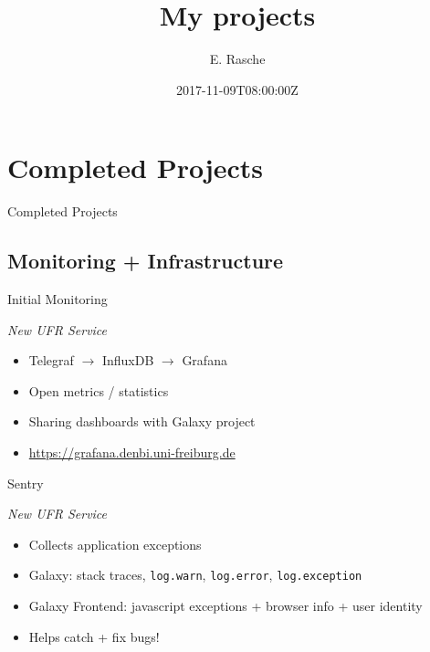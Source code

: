 \documentclass[12pt]{ufrslides}
\title[Projects]{My projects}
\author{E. Rasche}
\date{2017-11-09T08:00:00Z}
\begin{document}
\frame{\titlepage}

\section[Completed]{Completed Projects}
\begin{frame}{Completed Projects}
\end{frame}

\subsection[Monit/Infra]{Monitoring + Infrastructure}
	\begin{frame}{Initial Monitoring}
		\begin{center}
			\emph{New UFR Service}
		\end{center}
		\begin{itemize}
			\item Telegraf $\rightarrow$ InfluxDB $\rightarrow$ Grafana
			\item Open metrics / statistics
			\item Sharing dashboards with Galaxy project
			\item \url{https://grafana.denbi.uni-freiburg.de}
		\end{itemize}
	\end{frame}

	\begin{frame}{Sentry}
		\begin{center}
			\emph{New UFR Service}
		\end{center}
		\begin{itemize}
			\item Collects application exceptions
			\item Galaxy: stack traces, \texttt{log.warn}, \texttt{log.error}, \texttt{log.exception}
			\item Galaxy Frontend: javascript exceptions + browser info + user identity
			\item Helps catch + fix bugs!
		\end{itemize}
	\end{frame}
\end{document}
